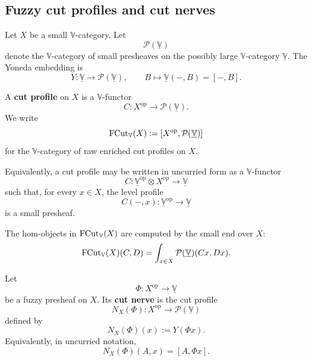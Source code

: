 \subsection{Fuzzy cut profiles and cut nerves}
\label{subsec:raw-enriched-cut-profiles-and-cut-nerves}

Let \(X\) be a small \(\mathbb V\)-category. Let
\[
    \mathcal P(\underline{\mathbb V})
\]
denote the \(\mathbb V\)-category of small presheaves on the possibly large \(\mathbb V\)-category \(\underline{\mathbb V}\). The Yoneda embedding is
\[
    Y:
    \underline{\mathbb V}
    \longrightarrow
    \mathcal P(\underline{\mathbb V}),
    \qquad
    B\longmapsto \underline{\mathbb V}(-,B)=[-,B].
\]

\begin{definition}
\label{def:cut-profile}
    A \textbf{cut profile} on \(X\) is a \(\mathbb V\)-functor
    \[
        C:X^{\mathrm{op}}\longrightarrow
        \mathcal P(\underline{\mathbb V}).
    \]
    We write
    \[
        \operatorname{FCut}_{\mathbb V}(X)
        :=
        [
            X^{\mathrm{op}},
            \mathcal P(\underline{\mathbb V})
        ]
    \]
    for the \(\mathbb V\)-category of raw enriched cut profiles on \(X\).
\end{definition}

Equivalently, a cut profile may be written in uncurried form as a \(\mathbb V\)-functor
\[
    C:
    \underline{\mathbb V}^{\mathrm{op}}
    \otimes
    X^{\mathrm{op}}
    \longrightarrow
    \underline{\mathbb V}
\]
such that, for every \(x\in X\), the level profile
\[
    C(-,x):
    \underline{\mathbb V}^{\mathrm{op}}
    \longrightarrow
    \underline{\mathbb V}
\]
is a small presheaf.

The hom-objects in \(\operatorname{FCut}_{\mathbb V}(X)\) are computed by the small end over \(X\):
\[
    \operatorname{FCut}_{\mathbb V}(X)(C,D)
    =
    \int_{x\in X}
    \mathcal P(\underline{\mathbb V})(C x,D x).
\]

\begin{definition}
\label{def:cut-nerve}
    Let
    \[
        \Phi:X^{\mathrm{op}}\to\underline{\mathbb V}
    \]
    be a fuzzy presheaf on \(X\). Its \textbf{cut nerve} is the cut profile
    \[
        N_X(\Phi):X^{\mathrm{op}}\to
        \mathcal P(\underline{\mathbb V})
    \]
    defined by
    \[
        N_X(\Phi)(x):=Y(\Phi x).
    \]
    Equivalently, in uncurried notation,
    \[
        N_X(\Phi)(A,x)
        =
        [A,\Phi x].
    \]
\end{definition}

